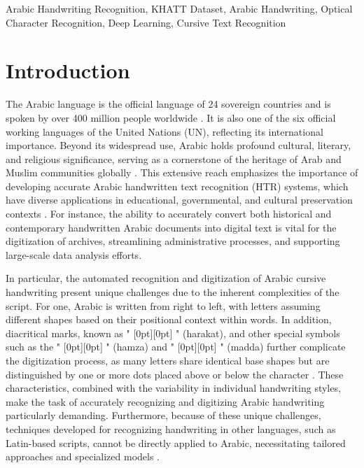 \documentclass[conference]{IEEEtran}
\newcommand{\artext}[1]{%
  {\fontsize{8pt}{11pt}\selectfont \raisebox{0pt}[0pt][0pt]{\RL{#1}}}%
}
\begin{document}

\begin{IEEEkeywords}
Arabic Handwriting Recognition, KHATT Dataset, Arabic Handwriting, Optical Character Recognition, Deep Learning, Cursive Text Recognition
\end{IEEEkeywords}

\section{Introduction}

The Arabic language is the official language of 24 sovereign countries and is spoken by over 400 million people worldwide \cite{saeed2024muharaf}. It is also one of the six official working languages of the United Nations (UN), reflecting its international importance. Beyond its widespread use, Arabic holds profound cultural, literary, and religious significance, serving as a cornerstone of the heritage of Arab and Muslim communities globally \cite{ayuba2013}. This extensive reach emphasizes the importance of developing accurate Arabic handwritten text recognition (HTR) systems, which have diverse applications in educational, governmental, and cultural preservation contexts \cite{mutawa2024machine}. For instance, the ability to accurately convert both historical and contemporary handwritten Arabic documents into digital text is vital for the digitization of archives, streamlining administrative processes, and supporting large-scale data analysis efforts.

In particular, the automated recognition and digitization of Arabic cursive handwriting present unique challenges due to the inherent complexities of the script. For one, Arabic is written from right to left, with letters assuming different shapes based on their positional context within words. In addition, diacritical marks, known as "\artext{حركات}" (harakat), and other special symbols such as the "\artext{همزة}" (hamza) and "\artext{مدّة}" (madda) further complicate the digitization process, as many letters share identical base shapes but are distinguished by one or more dots placed above or below the character \cite{el1990arabic}. These characteristics, combined with the variability in individual handwriting styles, make the task of accurately recognizing and digitizing Arabic handwriting particularly demanding. Furthermore, because of these unique challenges, techniques developed for recognizing handwriting in other languages, such as Latin-based scripts, cannot be directly applied to Arabic, necessitating tailored approaches and specialized models \cite{alrobah2022arabic}.
\end{document}

